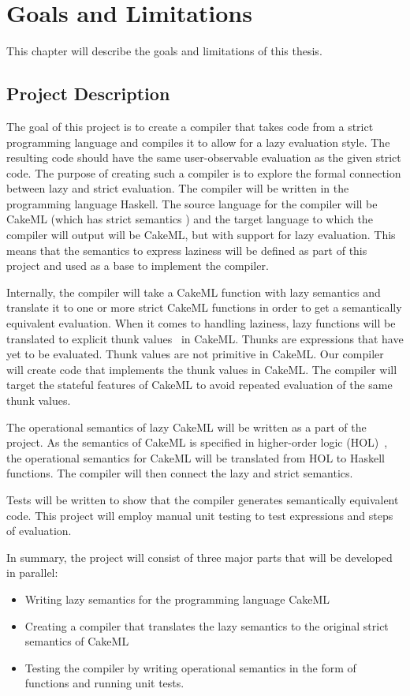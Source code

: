 \chapter{Goals and Limitations}
This chapter will describe the goals and limitations of this thesis.

\section{Project Description}
\label{intro:project}
The goal of this project is to create a compiler that takes code from a strict
programming language and compiles it to allow for a lazy evaluation style. The
resulting code should have the same user-observable evaluation as the given
strict code. The purpose of creating such a compiler is to explore the formal
connection between lazy and strict evaluation. The compiler will be written in
the programming language Haskell. The source language for the compiler will be
CakeML (which has strict semantics ) and the target language to which the
compiler will output will be CakeML, but with support for lazy evaluation. This
means that the semantics to express laziness will be defined as part of this
project and used as a base to implement the compiler.

Internally, the compiler will take a
CakeML function with lazy semantics and translate it to one
or more strict CakeML functions in order to get a semantically equivalent
evaluation. When it comes to handling laziness, lazy functions will be
translated to explicit thunk values~\cite{Ingerman:1961:TWC:366062.366084} in
CakeML. Thunks are expressions that have yet to be evaluated. Thunk values are
not primitive in CakeML. Our compiler will create code that
implements the thunk values in CakeML. The compiler will target the stateful
features of CakeML to avoid repeated evaluation of the same thunk values.

The operational semantics of lazy CakeML will be written as a part of the
project. As the semantics of CakeML is specified in higher-order logic
(HOL)~\cite{HOLInter57:online},
the operational semantics for CakeML will be translated from HOL to Haskell
functions. The compiler will then connect the lazy and strict semantics.

Tests will be written to show that the compiler generates semantically
equivalent code. This project will employ manual unit testing to test
expressions and steps of evaluation.

In summary, the project will consist of three major parts that will be developed
in parallel:
\begin{itemize}
 \item Writing lazy semantics for the programming language CakeML
 \item Creating a compiler that translates the lazy semantics to the original strict semantics of CakeML
 \item Testing the compiler by writing operational semantics in the form of functions and running unit tests.
\end{itemize}

